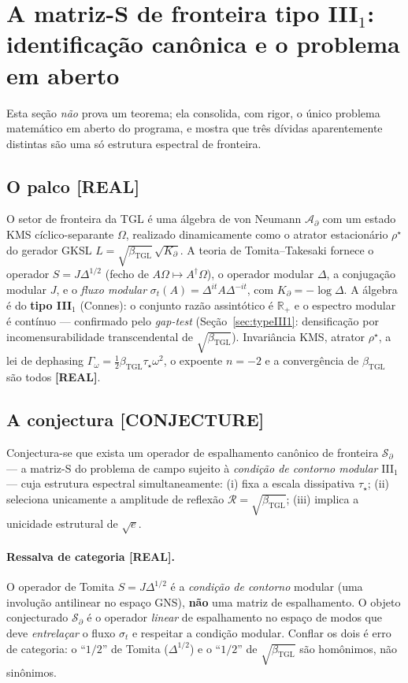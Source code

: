 \documentclass[12pt,a4paper]{article}
\newcommand{\betatgl}{\beta_{\text{TGL}}}
\newcommand{\Kpartial}{K_{\partial}}
\newcommand{\rhostar}{\rho^{\star}}
\newcommand{\TGL}{\textsc{TGL}}
\begin{document}
\section{A matriz-S de fronteira tipo III$_1$: identificação canônica e o problema em aberto}
\label{sec:smatrix}
Esta seção \emph{não} prova um teorema; ela consolida, com rigor, o único problema matemático em aberto do programa, e mostra que três dívidas aparentemente distintas são uma só estrutura espectral de fronteira.

\subsection{O palco \textbf{[REAL]}}
O setor de fronteira da \TGL{} é uma álgebra de von Neumann $\mathcal A_\partial$ com um estado KMS cíclico-separante $\Omega$, realizado dinamicamente como o atrator estacionário $\rhostar$ do gerador GKSL $L=\sqrt{\betatgl}\,\sqrt{\Kpartial}$. A teoria de Tomita--Takesaki fornece o operador $S=J\Delta^{1/2}$ (fecho de $A\Omega\mapsto A^\dagger\Omega$), o operador modular $\Delta$, a conjugação modular $J$, e o \emph{fluxo modular} $\sigma_t(A)=\Delta^{it}A\Delta^{-it}$, com $\Kpartial=-\log\Delta$.  A álgebra é do \textbf{tipo III$_1$} (Connes): o conjunto razão assintótico é $\mathbb{R}_+$ e o espectro modular é contínuo --- confirmado pelo \emph{gap-test} (Seção~\ref{sec:typeIII1}: densificação por incomensurabilidade transcendental de $\sqrt{\betatgl}$).  Invariância KMS, atrator $\rhostar$, a lei de dephasing $\Gamma_\omega=\tfrac12\betatgl\tau_\star\omega^2$, o expoente $n=-2$ e a convergência de $\betatgl$ são todos \textbf{[REAL]}.

\subsection{A conjectura \textbf{[CONJECTURE]}}
Conjectura-se que exista um operador de espalhamento canônico de fronteira $\mathcal S_\partial$ --- a matriz-S do problema de campo sujeito à \emph{condição de contorno modular} III$_1$ --- cuja estrutura espectral simultaneamente: (i) fixa a escala dissipativa $\tau_\star$; (ii) seleciona unicamente a amplitude de reflexão $\mathcal R=\sqrt{\betatgl}$; (iii) implica a unicidade estrutural de $\sqrt e$.

\paragraph{Ressalva de categoria \textbf{[REAL]}.} O operador de Tomita $S=J\Delta^{1/2}$ é a \emph{condição de contorno} modular (uma involução antilinear no espaço GNS), \textbf{não} uma matriz de espalhamento.  O objeto conjecturado $\mathcal S_\partial$ é o operador \emph{linear} de espalhamento no espaço de modos que deve \emph{entrelaçar} o fluxo $\sigma_t$ e respeitar a condição modular.  Conflar os dois é erro de categoria: o ``$1/2$'' de Tomita ($\Delta^{1/2}$) e o ``$1/2$'' de $\sqrt{\betatgl}$ são homônimos, não sinônimos.
\end{document}
